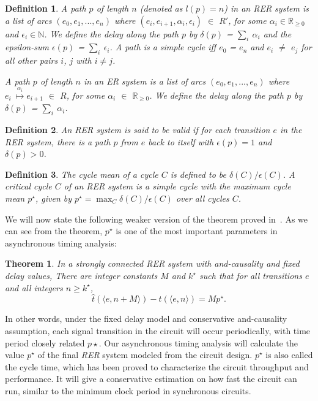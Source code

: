 \documentclass[sigconf, 10pt, twocolumn]{acmart}
\newtheorem{theorem}{Theorem}
\newtheorem{mydef}{Definition}
\begin{document}
\begin{mydef}
A path $p$ of length $n$ (denoted as $l(p) = n$) in an {\it RER\/} system is a list of arcs $(e_0,
e_1, ..., e_n)$ where $(e_i, e_{i+1}, \alpha_i, \epsilon_i)$ $\in$
$R'$, for some $\alpha_i \in \mathbb{R}_{\geq 0}$ and $\epsilon_i \in
\mathbb{N}$. We define the delay along the path $p$ by $\delta(p)$ =
$\sum_{i}\ \alpha_i$ and the epsilon-sum $\epsilon(p)$ =
$\sum_{i}\ \epsilon_i$. A path is a simple cycle iff $e_0$ = $e_n$ and
$e_i$ $\neq$ $e_j$ for all other pairs $i$, $j$ with $i\neq j$.

A path $p$ of length $n$ in an {\it ER\/} system is a list of arcs $(e_0,
e_1, ..., e_n)$ where $e_i \ \stackrel{\alpha_i}{\mapsto} e_{i+1}$
$\in$ $R$, for some $\alpha_i$ $\in$ $\mathbb{R}_{\geq 0}$. We define
the delay along the path $p$ by $\delta(p)$ =
$\sum_{i}\ \alpha_i$.
\end{mydef}
\begin{mydef}
An {\it RER\/} system is said to be valid if for each transition $e$ in the
{\it RER\/} system, there is a path $p$ from $e$ back to itself with
$\epsilon(p)=1$ and $\delta(p) > 0$.
\end{mydef}
\begin{mydef}
\label{def:critcycle}
The cycle mean of a cycle $C$ is defined to be $\delta(C)/\epsilon(C)$.
A critical cycle $C$ of an {\it RER\/} system is a simple cycle with the
maximum cycle mean $p^\star$, given by
$p^\star = \max_C \delta{(C)}/\epsilon{(C)}$ over all cycles $C$.
\end{mydef}
We will now state the following weaker version of the theorem proved in~\cite{Hua:Exact}. As we can see from the theorem, $p^\star$ is one of the most important parameters in asynchronous timing analysis:
\begin{theorem}
In a strongly connected {\it RER\/} system with and-causality and fixed delay values, There are integer constants $M$ and $k^\star$
such that for all transitions $e$ and all integers $n \geq k^\star$,
$$
\hat{t}(\langle e,n+M\rangle) - \hat{t}(\langle e, n\rangle) = Mp^{\star}.
$$
\end{theorem}
In other words, under the fixed delay model and conservative and-causality assumption, each signal transition in the circuit will occur periodically, with time period closely related $p\star$. Our asynchronous timing analysis will calculate the value $p^\star$ of the final {\it RER\/} system modeled from the circuit design. $p^\star$ is also called the cycle time, which has been proved to characterize the circuit throughput and performance. It will give a conservative estimation on how fast the circuit can run, similar to the minimum clock period in synchronous circuits.
\end{document}
